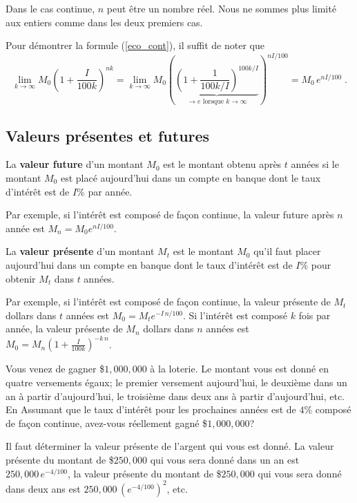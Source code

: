 {Dans le cas continue, $n$ peut être un nombre réel.  Nous ne sommes plus
limité aux entiers comme dans les deux premiers cas.

Pour démontrer la formule (\ref{eco_cont}), il suffit de noter que
\[
\lim_{k\rightarrow \infty} M_0\left(1+\frac{I}{100k}\right)^{nk}
= \lim_{k\rightarrow \infty} M_0\left(
\underbrace{\left(1+\frac{1}{100k/I}\right)^{100k/I}}_{\rightarrow e
\text{ lorsque } k \rightarrow \infty} \right)^{nI/100}
= M_0 \, e^{nI/100} \; .
\]

\subsection{Valeurs présentes et futures}

\begin{focus}{\dfn} 
La {\bfseries valeur future} d'un montant $M_0$
est le montant obtenu après $t$ années si le montant $M_0$ est placé
aujourd'hui dans un compte en banque dont le taux d'intérêt est de
$I$\% par année.
\end{focus}

Par exemple, si l'intérêt est composé de façon continue, la valeur
future après $n$ année est $M_n = M_0 e^{nI/100}$.

\begin{focus}{\dfn} 
La {\bfseries valeur présente} d'un montant
$M_t$ est le montant $M_0$ qu'il faut placer aujourd'hui dans un
compte en banque dont le taux d'intérêt est de $I$\% pour obtenir
$M_t$ dans $t$ années.
\end{focus}

Par exemple, si l'intérêt est composé de façon continue, la valeur
présente de $M_t$ dollars dans $t$ années est
$M_0 = M_t e^{-I\,n/100}$.  Si l'intérêt est composé $k$ fois par
année, la valeur présente de $M_n$ dollars dans $n$ 
années est
$\displaystyle M_0 = M_n \left(1 + \frac{I}{100k}\right)^{-k\,n}$.

\begin{egg}
Vous venez de gagner \$$1,000,000$ à la loterie.  Le montant vous est donné
en quatre versements égaux; le premier versement aujourd'hui, le deuxième
dans un an à partir d'aujourd'hui, le troisième dans deux ans à partir
d'aujourd'hui, etc.  En Assumant que le taux d'intérêt pour les
prochaines années est de $4$\% composé de façon continue,
avez-vous réellement gagné \$$1,000,000$?  

Il faut déterminer la valeur présente de l'argent qui vous est donné.  La
valeur présente du montant de \$$250,000$ qui vous sera donné dans un an est
$\displaystyle 250,000\,e^{-4/100}$, la valeur présente du montant de
\$$250,000$ qui vous sera donné dans deux ans est
$\displaystyle 250,000\,\left(e^{-4/100}\right)^2$, etc.


\end{egg}}

